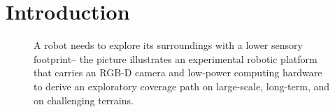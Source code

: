 \documentclass[lettersize,journal]{IEEEtran}
\theoremstyle{definition}
\begin{document}
\vspace*{-.3cm}
\section{Introduction}

\begin{figure}
  \vspace*{-.5cm}
       
  \caption{
    A robot needs to explore its surroundings with a lower sensory footprint--%
    the picture illustrates an experimental robotic platform that carries an RGB-D camera and low-power computing hardware to derive an exploratory coverage path on large-scale, long-term, and %
    on challenging terrains. %
  }
  \vspace*{-.4cm}
  \label{fig:0}
\end{figure}
\end{document}
